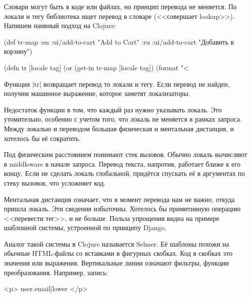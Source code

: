 Словари могут быть в коде или файлах, но принцип перевода не меняется. По локали
и тегу библиотека ищет перевод в словаре (<<совершает lookup>>). Напишем
наивный подход на Clojure:

  \begin{clojure}
(def tr-map
  {:en {:ui/add-to-cart "Add to Cart"}
   :ru {:ui/add-to-cart "Добавить в корзину"}})

(defn tr [locale tag]
  (or (get-in tr-map [locale tag])
      (format "<%
  \end{clojure}


Функция \spverb|tr| возвращает перевод то локали и тегу. Если перевод не найден,
получим машинное выражение, которое заметят локализаторы.

Недостаток функции в том, что каждый раз нужно указывать локаль. Это
утомительно, особенно с учетом того, что локаль не меняется в рамках
запроса. Между локалью и переводом большая физическая и ментальная
дистанция, и хотелось бы е\"{е} сократить.


Под физическим расстоянием понимают стек вызовов. Обычно локаль вычисляют в
middleware в начале запроса. Перевод текста, напротив, работает ближе к его
концу. Если не сделать локаль глобальной, прид\"{е}тся спускать е\"{е} в аргументах по
стеку вызовов, что усложняет код.


Ментальная дистанция означает, что в момент перевода нам не важно, откуда пришла
локаль. Эти сведения избыточны. Хотелось бы примитивную операцию <<перевести
тег>>, и не больше. Польза упрощения видна на примере шаблонной системы,
устроенной по принципу Django.


Аналог такой системы в Clojure называется
Selmer. Е\"{е} шаблоны похожи на
обычные HTML-файлы со вставками в фигурных скобках. Код в скобках это значения
или выражения. Вертикальные линии означают фильтры, функции
преобразования. Например, запись:

\begin{english}
  \begin{htmldjango}
<p>{{ user.email|lower }}</p>
  \end{htmldjango}
\end{english}

